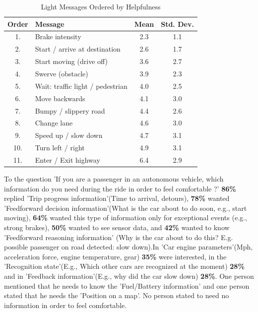 \begin{table}
  \caption{Light Messages Ordered by Helpfulness}
  \label{tab:order}
  \begin{tabular}[t]{clcc}
    \toprule
    Order & Message & Mean & Std. Dev.\\
    \midrule
1.  & Brake intensity                     & 2.3 & 1.1 \\
2.  & Start / arrive  at destination       & 2.6 & 1.7 \\
3.  & Start moving (drive off)            & 3.6 & 2.7 \\
4.  & Swerve (obstacle)                   & 3.9 & 2.3 \\
5.  & Wait: traffic light / pedestrian & 4.0 & 2.5 \\
6.  & Move backwards                      & 4.1 & 3.0 \\
7.  & Bumpy  / slippery road               & 4.4 & 2.6 \\
8.  & Change lane                         & 4.6 & 3.0 \\
9.  & Speed up / slow down                & 4.7 & 3.1 \\
10. & Turn left / right                   & 4.9 & 3.1 \\
11. & Enter / Exit highway                & 6.4 & 2.9
\end{tabular}
\end{table}

To the question 'If you are a passenger in an autonomous vehicle, which information do you need during the ride in order to feel comfortable ?' 
\textbf{86\%} replied 'Trip progress information'(Time to arrival, detours), \textbf{78\%} wanted 'Feedforward decision information'(What is the car about to do soon, e.g., start moving), \textbf{64\%} wanted this type of information only for exceptional events (e.g., strong brakes), \textbf{50\%} wanted to see sensor data, and \textbf{42\%} wanted to know 'Feedforward reasoning information' (Why is the car about to do this? E.g. possible passenger on road detected: slow down).In 'Car engine parameters'(Mph, acceleration force, engine temperature, gear) \textbf{35\%} were interested, in the 'Recognition state'(E.g., Which other cars are recognized at the moment) \textbf{28\%} and in 'Feedback information'(E.g., why did the car slow down) \textbf{28\%}. One person mentioned that he needs to know the 'Fuel/Battery information' and one person stated that he needs the 'Position on a map'. No person stated to need no information in order to feel comfortable. 

